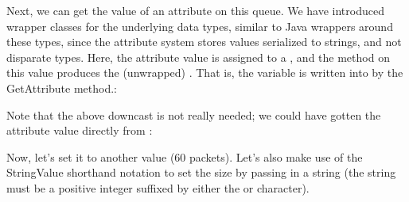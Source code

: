 \documentclass[letterpaper,10pt,english]{sphinxmanual}
\renewcommand{\sphinxcode}[1]{\texttt{\small{#1}}}
\begin{document}
Next, we can get the value of an attribute on this queue.  We have introduced
wrapper \sphinxcode{} classes for the underlying data types, similar
to Java wrappers around these types, since the attribute system stores values
serialized to strings, and not disparate types.  Here, the attribute value
is assigned to a \sphinxcode{}, and the \sphinxcode{}
method on this value produces the (unwrapped) \sphinxcode{}.  That is,
the variable  is written into by the GetAttribute method.:

\begin{sphinxVerbatim}[commandchars=\\\{\}]
 
  
    
\end{sphinxVerbatim}

Note that the above downcast is not really needed; we could have gotten
the attribute value directly from \sphinxcode{}:

\begin{sphinxVerbatim}[commandchars=\\\{\}]
  
    
\end{sphinxVerbatim}

Now, let’s set it to another value (60 packets).  Let’s also make
use of the StringValue shorthand notation to set the size by
passing in a string (the string must be a positive integer suffixed
by either the  or  character).

\begin{sphinxVerbatim}[commandchars=\\\{\}]
   
  
    
\end{sphinxVerbatim}
\end{document}

